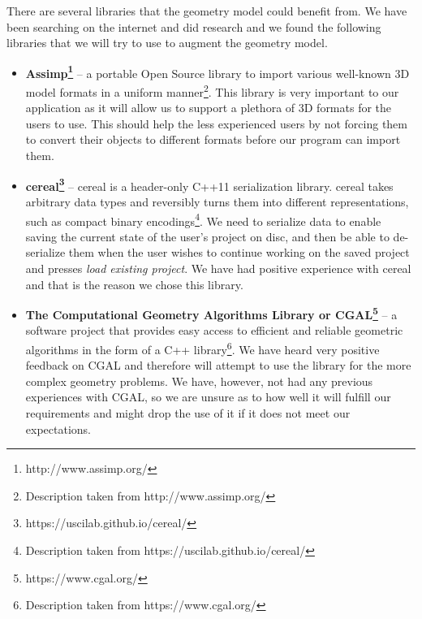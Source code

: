 There are several libraries that the geometry model could benefit from. We have been searching on the internet and did research and we found the following libraries that we will try to use to augment the geometry model.

\begin{itemize}
\item \textbf{Assimp\footnote{http://www.assimp.org/}} -- a portable Open Source library to import various well-known 3D model formats in a uniform manner\footnote{Description taken from http://www.assimp.org/}. This library is very important to our application as it will allow us to support a plethora of 3D formats for the users to use. This should help the less experienced users by not forcing them to convert their objects to different formats before our program can import them.

\item \textbf{cereal\footnote{https://uscilab.github.io/cereal/}} -- cereal is a header-only C++11 serialization library. cereal takes arbitrary data types and reversibly turns them into different representations, such as compact binary encodings\footnote{Description taken from https://uscilab.github.io/cereal/}. We need to serialize data to enable saving the current state of the user's project on disc, and then be able to de-serialize them when the user wishes to continue working on the saved project and presses \textit{load existing project}. We have had positive experience with cereal and that is the reason we chose this library.

\item \textbf{The Computational Geometry Algorithms Library or CGAL\footnote{https://www.cgal.org/}} -- a software project that provides easy access to efficient and reliable geometric algorithms in the form of a C++ library\footnote{Description taken from https://www.cgal.org/}. We have heard very positive feedback on CGAL and therefore will attempt to use the library for the more complex geometry problems. We have, however, not had any previous experiences with CGAL, so we are unsure as to how well it will fulfill our requirements and might drop the use of it if it does not meet our expectations.
\end{itemize}